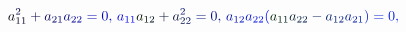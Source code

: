 \documentclass[12pt]{article}
\begin{document}
\makeatletter
\renewcommand*{\@textcolor}[3]{%
  \protect\leavevmode
  \begingroup
    \color#1{#2}#3%
  \endgroup
}
\makeatother
\begin{displaymath}
\mathcolor[RGB]{0,0,15}{a} _ { \mathcolor[RGB]{0,0,30}{1} \mathcolor[RGB]{0,0,45}{1} } ^ { \mathcolor[RGB]{0,0,60}{2} } \mathcolor[RGB]{0,0,75}{+} \mathcolor[RGB]{0,0,90}{a} _ { \mathcolor[RGB]{0,0,105}{2} \mathcolor[RGB]{0,0,120}{1} } \mathcolor[RGB]{0,0,135}{a} _ { \mathcolor[RGB]{0,0,150}{2} \mathcolor[RGB]{0,0,165}{2} } \mathcolor[RGB]{0,0,180}{=} \mathcolor[RGB]{0,0,195}{0} \mathcolor[RGB]{0,0,210}{,} \mathcolor[RGB]{0,0,225}{\,
a} _ { \mathcolor[RGB]{0,0,240}{1} \mathcolor[RGB]{0,0,255}{1} } \mathcolor[RGB]{0,15,0}{a} _ { \mathcolor[RGB]{0,15,15}{1} \mathcolor[RGB]{0,15,30}{2} } \mathcolor[RGB]{0,15,45}{+} \mathcolor[RGB]{0,15,60}{a} _ { \mathcolor[RGB]{0,15,75}{2} \mathcolor[RGB]{0,15,90}{2} } ^ { \mathcolor[RGB]{0,15,105}{2} } \mathcolor[RGB]{0,15,120}{=} \mathcolor[RGB]{0,15,135}{0} \mathcolor[RGB]{0,15,150}{,} \mathcolor[RGB]{0,15,165}{\,
a} _ { \mathcolor[RGB]{0,15,180}{1} \mathcolor[RGB]{0,15,195}{2} } \mathcolor[RGB]{0,15,210}{a} _ { \mathcolor[RGB]{0,15,225}{2} \mathcolor[RGB]{0,15,240}{2} } \mathcolor[RGB]{0,15,255}{(} \mathcolor[RGB]{0,30,0}{a} _ { \mathcolor[RGB]{0,30,15}{1} \mathcolor[RGB]{0,30,30}{1} } \mathcolor[RGB]{0,30,45}{a} _ { \mathcolor[RGB]{0,30,60}{2} \mathcolor[RGB]{0,30,75}{2} } \mathcolor[RGB]{0,30,90}{-} \mathcolor[RGB]{0,30,105}{a} _ { \mathcolor[RGB]{0,30,120}{1} \mathcolor[RGB]{0,30,135}{2} } \mathcolor[RGB]{0,30,150}{a} _ { \mathcolor[RGB]{0,30,165}{2} \mathcolor[RGB]{0,30,180}{1} } \mathcolor[RGB]{0,30,195}{)} \mathcolor[RGB]{0,30,210}{=} \mathcolor[RGB]{0,30,225}{0} \mathcolor[RGB]{0,30,240}{,} \,
\end{displaymath}
\end{document}
